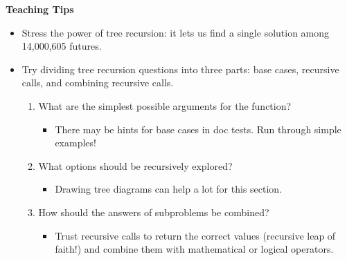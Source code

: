 \begin{guide}
\begin{blocksection}
\textbf{Teaching Tips}
\begin{itemize}
    \item Stress the power of tree recursion: it lets us find a single solution among 14,000,605 futures.
    \item Try dividing tree recursion questions into three parts: base cases, recursive calls, and combining recursive calls.
    \begin{enumerate}
        \item What are the simplest possible arguments for the function?
        \begin{itemize}
            \item There may be hints for base cases in doc tests. Run through simple examples!
        \end{itemize}
        \item What options should be recursively explored?
        \begin{itemize}
            \item Drawing tree diagrams can help a lot for this section.
        \end{itemize}
        \item How should the answers of subproblems be combined?
        \begin{itemize}
            \item Trust recursive calls to return the correct values (recursive leap of faith!) and combine them with mathematical or logical operators.
        \end{itemize}
    \end{enumerate}
\end{itemize}
\end{blocksection}
\end{guide}
